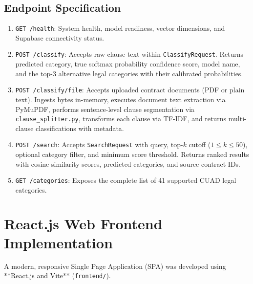 \subsection{Endpoint Specification}
\begin{enumerate}
    \item \texttt{GET /health}: System health, model readiness, vector dimensions, and Supabase connectivity status.
    \item \texttt{POST /classify}: Accepts raw clause text within \texttt{ClassifyRequest}. Returns predicted category, true softmax probability confidence score, model name, and the top-3 alternative legal categories with their calibrated probabilities.
    \item \texttt{POST /classify/file}: Accepts uploaded contract documents (PDF or plain text). Ingests bytes in-memory, executes document text extraction via PyMuPDF, performs sentence-level clause segmentation via \texttt{clause\_splitter.py}, transforms each clause via TF-IDF, and returns multi-clause classifications with metadata.
    \item \texttt{POST /search}: Accepts \texttt{SearchRequest} with query, top-$k$ cutoff ($1 \le k \le 50$), optional category filter, and minimum score threshold. Returns ranked results with cosine similarity scores, predicted categories, and source contract IDs.
    \item \texttt{GET /categories}: Exposes the complete list of 41 supported CUAD legal categories.
\end{enumerate}

\section{React.js Web Frontend Implementation}
\label{sec:frontend_implementation}

A modern, responsive Single Page Application (SPA) was developed using **React.js and Vite** (\texttt{frontend/}).

